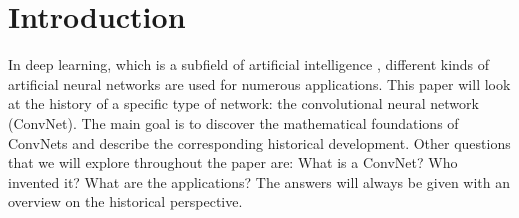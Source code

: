 

\section*{Introduction}

In deep learning, which is a subfield of artificial intelligence \cite[Ch. 1]{dl-book}, %
different kinds of artificial neural networks are used for numerous applications. This paper will look at the history of a specific type of network: the convolutional neural network (ConvNet). The main goal is to discover the mathematical foundations of ConvNets and describe the corresponding historical development. Other questions that we will explore throughout the paper are: What is a ConvNet? Who invented it? What are the applications? The answers will always be given with an overview on the historical perspective.





